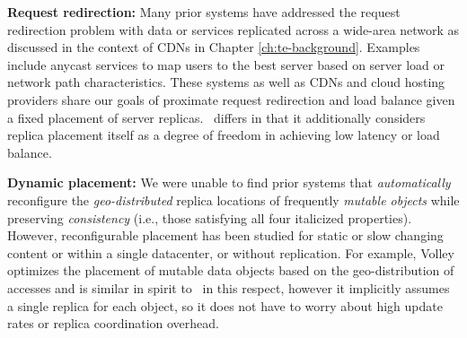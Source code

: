 \textbf{Request redirection:} Many prior systems have addressed the request redirection problem with data or services replicated across a wide-area network as discussed in the context of CDNs in Chapter \ref{ch:te-background}. Examples include anycast services \cite{oasis,Bhattacharjee:1997:AA:839292.843045,donar} to map users to the best server based on server load or network path characteristics. These systems as well as CDNs and cloud hosting providers share our goals of proximate request redirection and load balance given a fixed placement of server replicas. \auspice\ differs in that it additionally considers replica placement itself as a degree of freedom in achieving low latency or load balance.

\textbf{Dynamic placement:} We were unable to find prior systems that {\em automatically} reconfigure the {\em geo-distributed} replica locations of frequently {\em mutable objects} while preserving {\em consistency} (i.e., those satisfying all four italicized properties). However, reconfigurable placement has been studied for static or slow changing content \cite{gwertzman:95b} or within a single datacenter, or without replication. For example, Volley \cite{volley} optimizes the placement of mutable data objects based on the geo-distribution of accesses and is similar in spirit to \auspice\ in this respect, however it implicitly assumes a single replica for each object, so it does not have to worry about high update rates or replica coordination overhead. %






